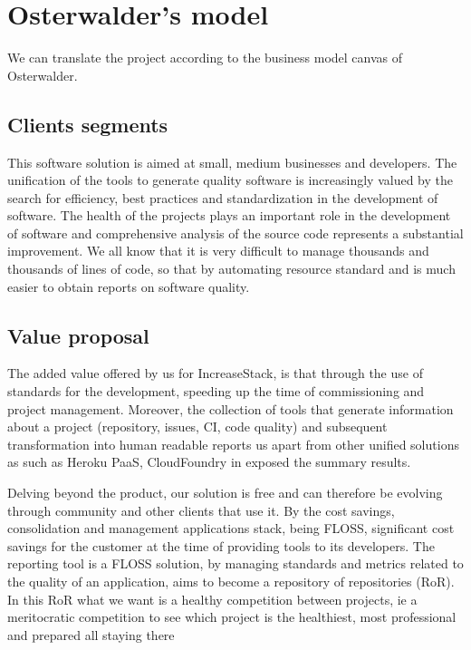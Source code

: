 \documentclass[11pt]{scrartcl}
\begin{document}
\section{Osterwalder's model}

\par We can translate the project according to the business model canvas of Osterwalder.

\subsection{Clients segments}

This software solution is aimed at small, medium businesses and developers. The unification of the tools to generate quality software is increasingly valued by the search for efficiency, best practices and standardization in the development of software. The health of the projects plays an important role in the development of software and comprehensive analysis of the source code represents a substantial improvement. We all know that it is very difficult to manage thousands and thousands of lines of code, so that by automating resource standard and is much easier to obtain reports on software quality.
    
\subsection{Value proposal}

\par The added value offered by us for IncreaseStack, is that through the use of standards for the development, speeding up the time of commissioning and project management. Moreover, the collection of tools that generate information about a project (repository, issues, CI, code quality) and subsequent transformation into human readable reports us apart from other unified solutions as such as Heroku PaaS, CloudFoundry in exposed the summary results.

\par Delving beyond the product, our solution is free and can therefore be evolving through community and other clients that use it. By the cost savings, consolidation and management applications stack, being FLOSS, significant cost savings for the customer at the time of providing tools to its developers. The reporting tool is a FLOSS solution, by managing standards and metrics related to the quality of an application, aims to become a repository of repositories (RoR). In this RoR what we want is a healthy competition between projects, ie a meritocratic competition to see which project is the healthiest, most professional and prepared all staying there
\end{document}
